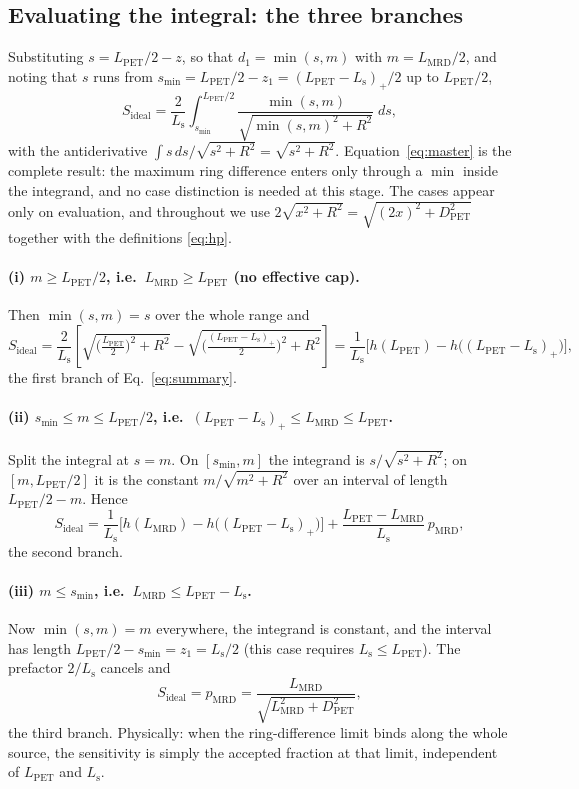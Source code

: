 \documentclass[11pt,a4paper]{article}
\newcommand{\Lpet}{L_{\mathrm{PET}}}
\newcommand{\Lsrc}{L_{\mathrm{s}}}
\newcommand{\Lmrd}{L_{\mathrm{MRD}}}
\newcommand{\Dpet}{D_{\mathrm{PET}}}
\newcommand{\Sid}{S_{\mathrm{ideal}}}
\begin{document}
\subsection{Evaluating the integral: the three branches}
\label{sec:equiv}

Substituting $s=\Lpet/2-z$, so that $d_1=\min(s,m)$ with $m=\Lmrd/2$, and noting that $s$
runs from $s_{\min}=\Lpet/2-z_1=(\Lpet-\Lsrc)_+/2$ up to $\Lpet/2$,
\begin{equation}
  \Sid=\frac{2}{\Lsrc}\int_{s_{\min}}^{\Lpet/2}
        \frac{\min(s,m)}{\sqrt{\min(s,m)^2+R^2}}\;ds ,
  \label{eq:master}
\end{equation}
with the antiderivative $\int s\,ds/\sqrt{s^{2}+R^{2}}=\sqrt{s^{2}+R^{2}}$.
Equation~\eqref{eq:master} is the complete result: the maximum ring difference enters only
through a $\min$ inside the integrand, and no case distinction is needed at this stage. The
cases appear only on evaluation, and throughout we use
$2\sqrt{x^{2}+R^{2}}=\sqrt{(2x)^{2}+\Dpet^{2}}$ together with the definitions
\eqref{eq:hp}.

\paragraph{(i) $m\ge \Lpet/2$, i.e.\ $\Lmrd\ge \Lpet$ (no effective cap).}
Then $\min(s,m)=s$ over the whole range and
\begin{equation}
  \Sid=\frac{2}{\Lsrc}\left[\sqrt{\Big(\tfrac{\Lpet}{2}\Big)^{2}+R^{2}}
       -\sqrt{\Big(\tfrac{(\Lpet-\Lsrc)_+}{2}\Big)^{2}+R^{2}}\right]
      =\frac{1}{\Lsrc}\Big[h(\Lpet)-h\big((\Lpet-\Lsrc)_+\big)\Big] ,
\end{equation}
the first branch of Eq.~\eqref{eq:summary}.

\paragraph{(ii) $s_{\min}\le m\le \Lpet/2$, i.e.\ $(\Lpet-\Lsrc)_+\le\Lmrd\le \Lpet$.}
Split the integral at $s=m$. On $[s_{\min},m]$ the integrand is $s/\sqrt{s^2+R^2}$; on
$[m,\Lpet/2]$ it is the constant $m/\sqrt{m^2+R^2}$ over an interval of length
$\Lpet/2-m$. Hence
\begin{equation}
  \Sid=\frac{1}{\Lsrc}\Big[h(\Lmrd)-h\big((\Lpet-\Lsrc)_+\big)\Big]
      +\frac{\Lpet-\Lmrd}{\Lsrc}\,p_{\mathrm{MRD}} ,
\end{equation}
the second branch.

\paragraph{(iii) $m\le s_{\min}$, i.e.\ $\Lmrd\le \Lpet-\Lsrc$.}
Now $\min(s,m)=m$ everywhere, the integrand is constant, and the interval has length
$\Lpet/2-s_{\min}=z_1=\Lsrc/2$ (this case requires $\Lsrc\le \Lpet$). The prefactor
$2/\Lsrc$ cancels and
\begin{equation}
  \Sid=p_{\mathrm{MRD}}=\frac{\Lmrd}{\sqrt{\Lmrd^{2}+\Dpet^{2}}} ,
\end{equation}
the third branch. Physically: when the ring-difference limit binds along the whole source,
the sensitivity is simply the accepted fraction at that limit, independent of $\Lpet$ and
$\Lsrc$.
\end{document}
